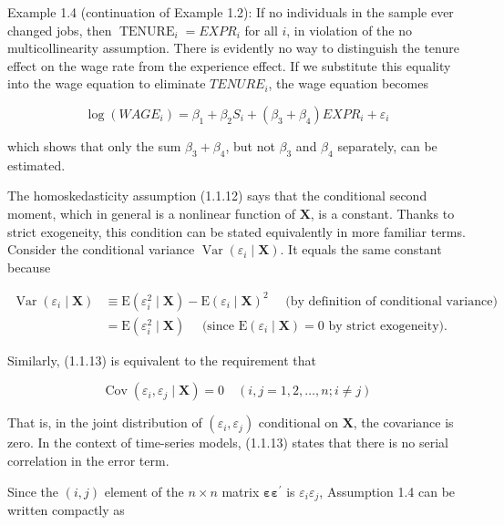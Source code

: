 \documentclass[10pt]{article}
\begin{document}
Example 1.4 (continuation of Example 1.2): If no individuals in the sample ever changed jobs, then $\operatorname{TENURE}_{i}=E X P R_{i}$ for all $i$, in violation of the no multicollinearity assumption. There is evidently no way to distinguish the tenure effect on the wage rate from the experience effect. If we substitute this equality into the wage equation to eliminate $T E N U R E_{i}$, the wage equation becomes

$$
\log \left(W A G E_{i}\right)=\beta_{1}+\beta_{2} S_{i}+\left(\beta_{3}+\beta_{4}\right) E X P R_{i}+\varepsilon_{i}
$$

which shows that only the sum $\beta_{3}+\beta_{4}$, but not $\beta_{3}$ and $\beta_{4}$ separately, can be estimated.

The homoskedasticity assumption (1.1.12) says that the conditional second moment, which in general is a nonlinear function of $\mathbf{X}$, is a constant. Thanks to strict exogeneity, this condition can be stated equivalently in more familiar terms. Consider the conditional variance $\operatorname{Var}\left(\varepsilon_{i} \mid \mathbf{X}\right)$. It equals the same constant because

$$
\begin{aligned}
\operatorname{Var}\left(\varepsilon_{i} \mid \mathbf{X}\right) & \equiv \mathrm{E}\left(\varepsilon_{i}^{2} \mid \mathbf{X}\right)-\mathrm{E}\left(\varepsilon_{i} \mid \mathbf{X}\right)^{2} \quad \text { (by definition of conditional variance) } \\
& =\mathrm{E}\left(\varepsilon_{i}^{2} \mid \mathbf{X}\right) \quad \text { (since } \mathrm{E}\left(\varepsilon_{i} \mid \mathbf{X}\right)=0 \text { by strict exogeneity). }
\end{aligned}
$$

Similarly, (1.1.13) is equivalent to the requirement that

$$
\operatorname{Cov}\left(\varepsilon_{i}, \varepsilon_{j} \mid \mathbf{X}\right)=0 \quad(i, j=1,2, \ldots, n ; i \neq j)
$$

That is, in the joint distribution of $\left(\varepsilon_{i}, \varepsilon_{j}\right)$ conditional on $\mathbf{X}$, the covariance is zero. In the context of time-series models, (1.1.13) states that there is no serial correlation in the error term.

Since the $(i, j)$ element of the $n \times n$ matrix $\boldsymbol{\varepsilon} \boldsymbol{\varepsilon}^{\prime}$ is $\varepsilon_{i} \varepsilon_{j}$, Assumption 1.4 can be written compactly as
\end{document}
